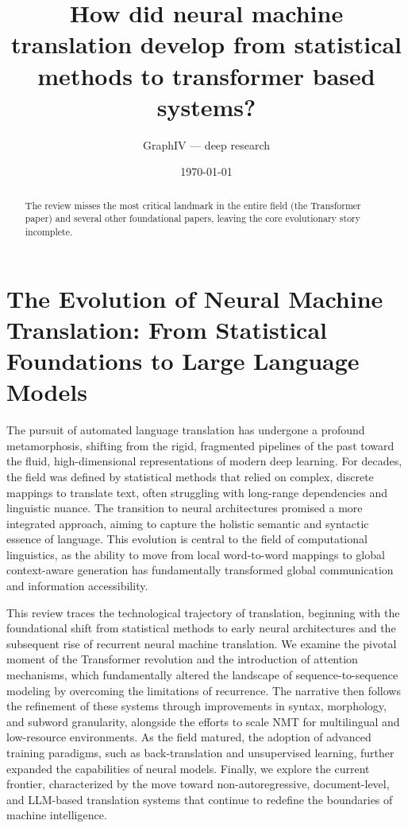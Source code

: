 \documentclass[11pt]{article}
\title{How did neural machine translation develop from statistical methods to transformer based systems?}
\author{GraphIV --- deep research}
\date{\today}
\begin{document}
\maketitle

\begin{abstract}
The review misses the most critical landmark in the entire field (the Transformer paper) and several other foundational papers, leaving the core evolutionary story incomplete.
\end{abstract}

\section{The Evolution of Neural Machine Translation: From Statistical Foundations to Large Language Models}

The pursuit of automated language translation has undergone a profound metamorphosis, shifting from the rigid, fragmented pipelines of the past toward the fluid, high-dimensional representations of modern deep learning. For decades, the field was defined by statistical methods that relied on complex, discrete mappings to translate text, often struggling with long-range dependencies and linguistic nuance. The transition to neural architectures promised a more integrated approach, aiming to capture the holistic semantic and syntactic essence of language. This evolution is central to the field of computational linguistics, as the ability to move from local word-to-word mappings to global context-aware generation has fundamentally transformed global communication and information accessibility.

This review traces the technological trajectory of translation, beginning with the foundational shift from statistical methods to early neural architectures and the subsequent rise of recurrent neural machine translation. We examine the pivotal moment of the Transformer revolution and the introduction of attention mechanisms, which fundamentally altered the landscape of sequence-to-sequence modeling by overcoming the limitations of recurrence. The narrative then follows the refinement of these systems through improvements in syntax, morphology, and subword granularity, alongside the efforts to scale NMT for multilingual and low-resource environments. As the field matured, the adoption of advanced training paradigms, such as back-translation and unsupervised learning, further expanded the capabilities of neural models. Finally, we explore the current frontier, characterized by the move toward non-autoregressive, document-level, and LLM-based translation systems that continue to redefine the boundaries of machine intelligence.
\end{document}
